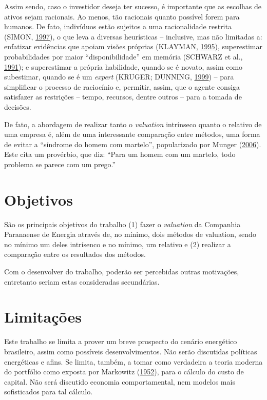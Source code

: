 \documentclass[grad,numbers]{coppe}
\begin{document}
  Assim sendo, caso o investidor deseja ter sucesso, é importante que as escolhas de ativos sejam racionais. Ao menos, tão racionais quanto possível forem para humanos. De fato, indivíduos estão sujeitos a uma racionalidade restrita (SIMON, \protect\hyperlink{ref-simon1997}{1997}), o que leva a diversas heurísticas -- inclusive, mas não limitadas a: enfatizar evidências que apoiam visões próprias (KLAYMAN, \protect\hyperlink{ref-klayman1995}{1995}), superestimar probabilidades por maior ``disponibilidade'' em memória (SCHWARZ et al., \protect\hyperlink{ref-schwarz1991}{1991}); e superestimar a própria habilidade, quando se é novato, assim como subestimar, quando se é um \emph{expert} (KRUGER; DUNNING, \protect\hyperlink{ref-kruger1999}{1999}) -- para simplificar o processo de raciocínio e, permitir, assim, que o agente consiga satisfazer as restrições -- tempo, recursos, dentre outros -- para a tomada de decisões.

  De fato, a abordagem de realizar tanto o \emph{valuation} intrínseco quanto o relativo de uma empresa é, além de uma interessante comparação entre métodos, uma forma de evitar a ``síndrome do homem com martelo'', popularizado por Munger (\protect\hyperlink{ref-munger2006}{2006}). Este cita um provérbio, que diz: ``Para um homem com um martelo, todo problema se parece com um prego.''

  \hypertarget{objetivos}{%
  \section{Objetivos}\label{objetivos}}

  São os principais objetivos do trabalho (1) fazer o \emph{valuation} da Companhia Paranaense de Energia através de, no mínimo, dois métodos de valuation, sendo no mínimo um deles intrísenco e no mínimo, um relativo e (2) realizar a comparação entre os resultados dos métodos.

  Com o desenvolver do trabalho, poderão ser percebidas outras motivações, entretanto seriam estas consideradas secundárias.

  \hypertarget{limitauxe7uxf5es}{%
  \section{Limitações}\label{limitauxe7uxf5es}}

  Este trabalho se limita a prover um breve prospecto do cenário energético brasileiro, assim como possíveis desenvolvimentos. Não serão discutidas políticas energéticas e afins. Se limita, também, a tomar como verdadeira a teoria moderna do portfólio como exposta por Markowitz (\protect\hyperlink{ref-markowitz1952}{1952}), para o cálculo do custo de capital. Não será discutido economia comportamental, nem modelos mais sofisticados para tal cálculo.
\end{document}
